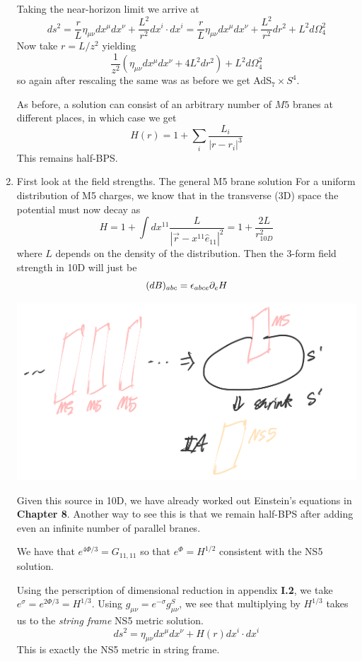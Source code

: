 \documentclass[11pt, class=article, crop=false]{standalone}
\begin{document}
\begin{enumerate}
	Taking the near-horizon limit we arrive at
	\[
		ds^2 = \frac{r}{L}  \eta_{\mu \nu} dx^\mu dx^\nu + \frac{L^2}{r^2} dx^i \cdot dx^i = \frac{r}{L} \eta_{\mu \nu} dx^\mu dx^\nu + \frac{L^2}{r^2} dr^2 + L^2 d\Omega_4^2
	\]
	Now take $r = L/z^2$ yielding 
	\[
		\frac{1}{z^2}  (\eta_{\mu \nu} dx^\mu dx^\nu  + 4 L^2 dr^2) + L^2 d\Omega_4^2
	\]
	so again after rescaling the same was as before we get AdS$_7 \times S^4$.
	
	As before, a solution can consist of an arbitrary number of $M5$ branes at different places, in which case we get
	\[
		H(r) = 1 + \sum_{i} \frac{L_i}{|r-r_i|^3}
	\]
	This remains half-BPS.

	\item First look at the field strengths. The general M5 brane solution 
	 For a uniform distribution of M5 charges, we know that in the transverse (3D) space the potential must now decay as
	\[
		H = 1 + \int dx^{11} \frac{L}{|\vec r - x^{11} \hat e_{11}|^2} = 1 + \frac{2L}{r_{10D}^2}
	\]
	where $L$ depends on the density of the distribution. Then the $3$-form field strength in 10D will just be
	\[
		(dB)_{abc} = \epsilon_{abce} \partial_e H
	\]
	\begin{center}
		\includegraphics[scale=0.2]{"Drawings/M5"}
	\end{center}
	
	
	 Given this source in 10D, we have already worked out Einstein's equations in \textbf{Chapter 8}. Another way to see this is that we remain half-BPS after adding even an infinite number of parallel branes. 
	
	We have that $e^{4\Phi/3} = G_{11,11}$ so that $e^\Phi = H^{1/2}$ consistent with the NS5 solution. 
	
	Using the perscription of dimensional reduction in appendix \textbf{I.2}, we take $e^{\sigma} = e^{2\Phi/3} = H^{1/3}$. Using $g_{\mu \nu} = e^{-\sigma} g^S_{\mu\nu}$, we see that multiplying by $H^{1/3}$ takes us to the \emph{string frame} NS5 metric solution. 
	\[
		ds^2 = \eta_{\mu \nu} dx^\mu dx^\nu + H(r) dx^i \cdot dx^i
	\]
	This is exactly the NS5 metric in string frame.
	

\end{enumerate}
\end{document}
